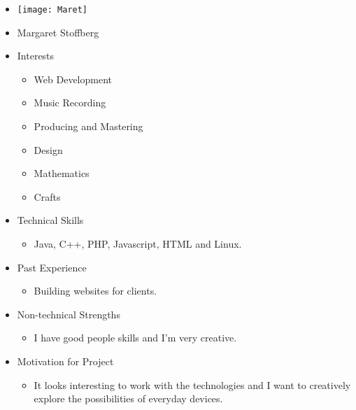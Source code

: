 
\begin{itemize}
	\item[] \texttt{[image: Maret]}
	\item[] Margaret Stoffberg
	\item Interests
	\begin{itemize}
		\item Web Development
		\item Music Recording
		\item Producing and Mastering
		\item Design
		\item Mathematics
		\item Crafts
	\end{itemize}
	\item Technical Skills
	\begin{itemize}
		\item[] Java, C++, PHP, Javascript, HTML and Linux.
	\end{itemize}
	\item Past Experience
	\begin{itemize}
		\item[] Building websites for clients.
	\end{itemize}
	\item Non-technical Strengths
	\begin{itemize}
		\item[] I have good people skills and I'm very creative.
	\end{itemize}
	\item Motivation for Project
	\begin{itemize}
		\item[] It looks interesting to work with the technologies and I want to creatively explore the possibilities of everyday devices.
	\end{itemize}
\end{itemize}